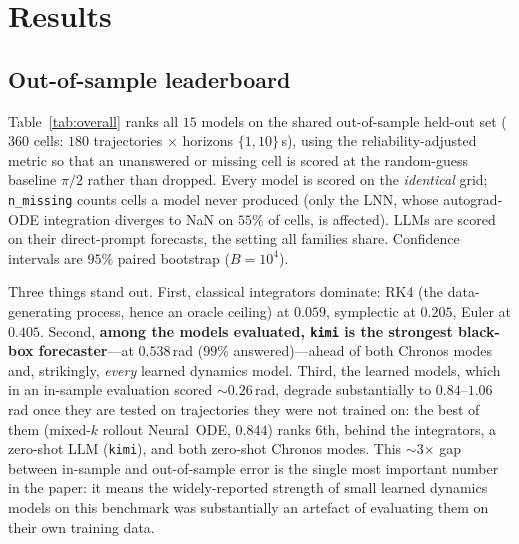 \documentclass{article}
\begin{document}
\section{Results}

\subsection{Out-of-sample leaderboard}
\label{sec:reliability}
Table~\ref{tab:overall} ranks all $15$ models on the shared out-of-sample
held-out set ($360$ cells: $180$ trajectories $\times$ horizons $\{1,10\}$\,s),
using the reliability-adjusted metric so that an unanswered or missing cell is
scored at the random-guess baseline $\pi/2$ rather than dropped. Every model is
scored on the \emph{identical} grid; \texttt{n\_missing} counts cells a model never
produced (only the LNN, whose autograd-ODE integration diverges to NaN on $55\%$ of
cells, is affected). LLMs are scored on their direct-prompt forecasts, the setting
all families share. Confidence intervals are $95\%$ paired bootstrap ($B{=}10^4$).

Three things stand out. First, classical integrators dominate: RK4 (the
data-generating process, hence an oracle ceiling) at $0.059$, symplectic at $0.205$,
Euler at $0.405$. Second, \textbf{among the models evaluated, \texttt{kimi} is the
strongest black-box forecaster}---at $0.538$\,rad ($99\%$ answered)---ahead of both
Chronos modes and, strikingly, \emph{every} learned dynamics model. Third, the learned
models, which in an in-sample evaluation scored ${\sim}0.26$\,rad, degrade substantially
to $0.84$--$1.06$\,rad once
they are tested on trajectories they were not trained on: the best of them
(mixed-$k$ rollout Neural~ODE, $0.844$) ranks $6$th, behind the integrators, a
zero-shot LLM (\texttt{kimi}), and both zero-shot Chronos modes. This $\sim$3$\times$ gap between in-sample and
out-of-sample error is the single most important number in the paper: it means the
widely-reported strength of small learned dynamics models on this benchmark was
substantially an artefact of evaluating them on their own training data.
\end{document}
